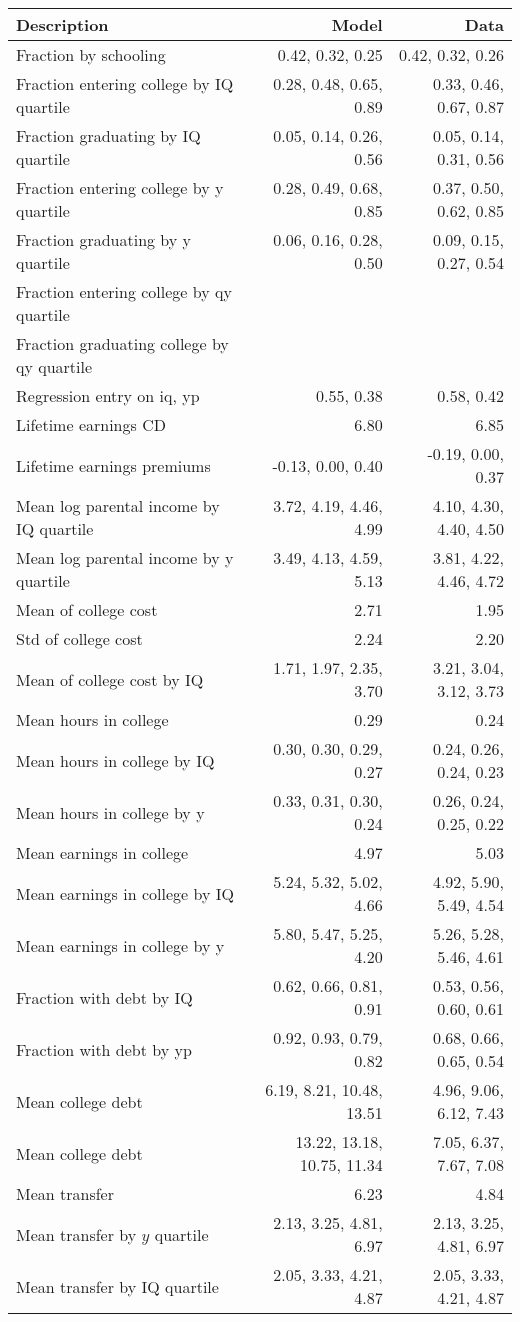 \begin{tabular}{lrr}
\hline
Description & Model  & Data  \\ 
\hline
Fraction by schooling & 0.42, 0.32, 0.25  & 0.42, 0.32, 0.26  \\ 
Fraction entering college by IQ quartile & 0.28, 0.48, 0.65, 0.89  & 0.33, 0.46, 0.67, 0.87  \\ 
Fraction graduating by IQ quartile & 0.05, 0.14, 0.26, 0.56  & 0.05, 0.14, 0.31, 0.56  \\ 
Fraction entering college by y quartile & 0.28, 0.49, 0.68, 0.85  & 0.37, 0.50, 0.62, 0.85  \\ 
Fraction graduating by y quartile & 0.06, 0.16, 0.28, 0.50  & 0.09, 0.15, 0.27, 0.54  \\ 
Fraction entering college by qy quartile &   &   \\ 
Fraction graduating college by qy quartile &   &   \\ 
Regression entry on iq, yp & 0.55, 0.38  & 0.58, 0.42  \\ 
Lifetime earnings CD & 6.80  & 6.85  \\ 
Lifetime earnings premiums & -0.13, 0.00, 0.40  & -0.19, 0.00, 0.37  \\ 
Mean log parental income by IQ quartile & 3.72, 4.19, 4.46, 4.99  & 4.10, 4.30, 4.40, 4.50  \\ 
Mean log parental income by y quartile & 3.49, 4.13, 4.59, 5.13  & 3.81, 4.22, 4.46, 4.72  \\ 
Mean of college cost & 2.71  & 1.95  \\ 
Std of college cost & 2.24  & 2.20  \\ 
Mean of college cost by IQ & 1.71, 1.97, 2.35, 3.70  & 3.21, 3.04, 3.12, 3.73  \\ 
Mean hours in college & 0.29  & 0.24  \\ 
Mean hours in college by IQ & 0.30, 0.30, 0.29, 0.27  & 0.24, 0.26, 0.24, 0.23  \\ 
Mean hours in college by y & 0.33, 0.31, 0.30, 0.24  & 0.26, 0.24, 0.25, 0.22  \\ 
Mean earnings in college & 4.97  & 5.03  \\ 
Mean earnings in college by IQ & 5.24, 5.32, 5.02, 4.66  & 4.92, 5.90, 5.49, 4.54  \\ 
Mean earnings in college by y & 5.80, 5.47, 5.25, 4.20  & 5.26, 5.28, 5.46, 4.61  \\ 
Fraction with debt by IQ & 0.62, 0.66, 0.81, 0.91  & 0.53, 0.56, 0.60, 0.61  \\ 
Fraction with debt by yp & 0.92, 0.93, 0.79, 0.82  & 0.68, 0.66, 0.65, 0.54  \\ 
Mean college debt & 6.19, 8.21, 10.48, 13.51  & 4.96, 9.06, 6.12, 7.43  \\ 
Mean college debt & 13.22, 13.18, 10.75, 11.34  & 7.05, 6.37, 7.67, 7.08  \\ 
Mean transfer & 6.23  & 4.84  \\ 
Mean transfer by $y$ quartile & 2.13, 3.25, 4.81, 6.97  & 2.13, 3.25, 4.81, 6.97  \\ 
Mean transfer by IQ quartile & 2.05, 3.33, 4.21, 4.87  & 2.05, 3.33, 4.21, 4.87  \\ 
\hline
\end{tabular}%
